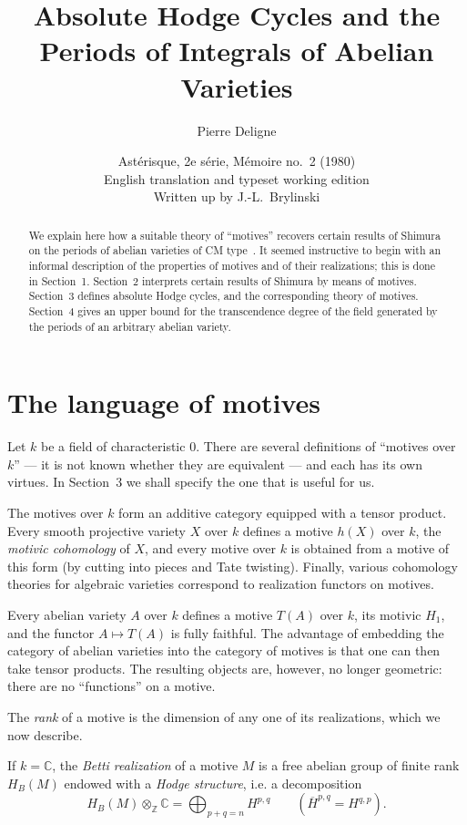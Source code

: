 \documentclass[11pt]{amsart}
\title[Absolute Hodge cycles]{Absolute Hodge Cycles and the Periods of Integrals of Abelian Varieties}
\author{Pierre Deligne}
\date{Ast\'erisque, 2e s\'erie, M\'emoire no.~2 (1980)\\English translation and typeset working edition\\Written up by J.-L.~Brylinski}
\theoremstyle{definition}
\newcommand{\ZZ}{\mathbb{Z}}
\newcommand{\CC}{\mathbb{C}}
\begin{document}
\maketitle

\begin{abstract}
We explain here how a suitable theory of ``motives'' recovers certain results of Shimura on the periods of abelian varieties of CM type~\cite{Shimura2}. It seemed instructive to begin with an informal description of the properties of motives and of their realizations; this is done in Section~1. Section~2 interprets certain results of Shimura by means of motives. Section~3 defines absolute Hodge cycles, and the corresponding theory of motives. Section~4 gives an upper bound for the transcendence degree of the field generated by the periods of an arbitrary abelian variety.
\end{abstract}

\section{The language of motives}

Let $k$ be a field of characteristic $0$. There are several definitions of ``motives over $k$'' --- it is not known whether they are equivalent --- and each has its own virtues. In Section~3 we shall specify the one that is useful for us.

The motives over $k$ form an additive category equipped with a tensor product. Every smooth projective variety $X$ over $k$ defines a motive $h(X)$ over $k$, the \emph{motivic cohomology} of $X$, and every motive over $k$ is obtained from a motive of this form (by cutting into pieces and Tate twisting). Finally, various cohomology theories for algebraic varieties correspond to realization functors on motives.

Every abelian variety $A$ over $k$ defines a motive $T(A)$ over $k$, its motivic $H_1$, and the functor $A \mapsto T(A)$ is fully faithful. The advantage of embedding the category of abelian varieties into the category of motives is that one can then take tensor products. The resulting objects are, however, no longer geometric: there are no ``functions'' on a motive.

The \emph{rank} of a motive is the dimension of any one of its realizations, which we now describe.

If $k=\CC$, the \emph{Betti realization} of a motive $M$ is a free abelian group of finite rank $H_B(M)$ endowed with a \emph{Hodge structure}, i.e. a decomposition
\[
H_B(M)\otimes_\ZZ \CC = \bigoplus_{p+q=n} H^{p,q}
\qquad (\overline{H}^{p,q}=H^{q,p}).
\]
\end{document}
